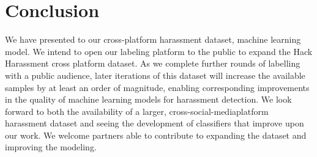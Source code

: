 \documentclass[11pt,a4paper]{article}
\begin{document}
\section{Conclusion}
We have presented to our cross-platform harassment
dataset, machine learning model. We intend
to open our labeling platform to the public to expand
the Hack Harassment cross platform dataset.
As we complete further rounds of labelling with a
public audience, later iterations of this dataset will
increase the available samples by at least an order
of magnitude, enabling corresponding improvements
in the quality of machine learning models
for harassment detection. We look forward to both
the availability of a larger, cross-social-mediaplatform
harassment dataset and seeing the development
of classifiers that improve upon our work.
We welcome partners able to contribute to expanding
the dataset and improving the modeling.

%
%


\end{document}
